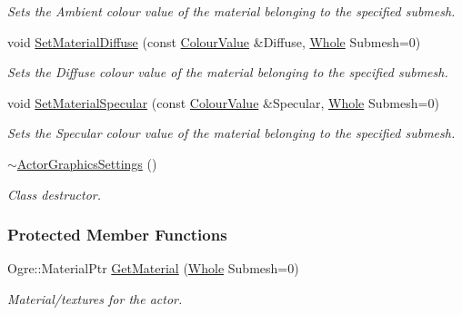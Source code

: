 \begin{DoxyCompactItemize}
\begin{DoxyCompactList}\small\item\em Sets the Ambient colour value of the material belonging to the specified submesh. \item\end{DoxyCompactList}\item 
void \hyperlink{classphys_1_1ActorGraphicsSettings_a135bebcafc6a2386aaec61bce7a5e548}{SetMaterialDiffuse} (const \hyperlink{classphys_1_1ColourValue}{ColourValue} \&Diffuse, \hyperlink{namespacephys_a460f6bc24c8dd347b05e0366ae34f34a}{Whole} Submesh=0)
\begin{DoxyCompactList}\small\item\em Sets the Diffuse colour value of the material belonging to the specified submesh. \item\end{DoxyCompactList}\item 
void \hyperlink{classphys_1_1ActorGraphicsSettings_a51bfae72380679093595c1805b1d940b}{SetMaterialSpecular} (const \hyperlink{classphys_1_1ColourValue}{ColourValue} \&Specular, \hyperlink{namespacephys_a460f6bc24c8dd347b05e0366ae34f34a}{Whole} Submesh=0)
\begin{DoxyCompactList}\small\item\em Sets the Specular colour value of the material belonging to the specified submesh. \item\end{DoxyCompactList}\item 
\hypertarget{classphys_1_1ActorGraphicsSettings_a3c6f9f1dd5bcceda2db65f1514313e14}{
\hyperlink{classphys_1_1ActorGraphicsSettings_a3c6f9f1dd5bcceda2db65f1514313e14}{$\sim$ActorGraphicsSettings} ()}
\label{classphys_1_1ActorGraphicsSettings_a3c6f9f1dd5bcceda2db65f1514313e14}

\begin{DoxyCompactList}\small\item\em Class destructor. \item\end{DoxyCompactList}\end{DoxyCompactItemize}
\subsubsection*{Protected Member Functions}
\begin{DoxyCompactItemize}
\item 
\hypertarget{classphys_1_1ActorGraphicsSettings_ade1b760cc01187e9ffdeed8871533066}{
Ogre::MaterialPtr \hyperlink{classphys_1_1ActorGraphicsSettings_ade1b760cc01187e9ffdeed8871533066}{GetMaterial} (\hyperlink{namespacephys_a460f6bc24c8dd347b05e0366ae34f34a}{Whole} Submesh=0)}
\label{classphys_1_1ActorGraphicsSettings_ade1b760cc01187e9ffdeed8871533066}

\begin{DoxyCompactList}\small\item\em Material/textures for the actor. \item\end{DoxyCompactList}\end{DoxyCompactItemize}
